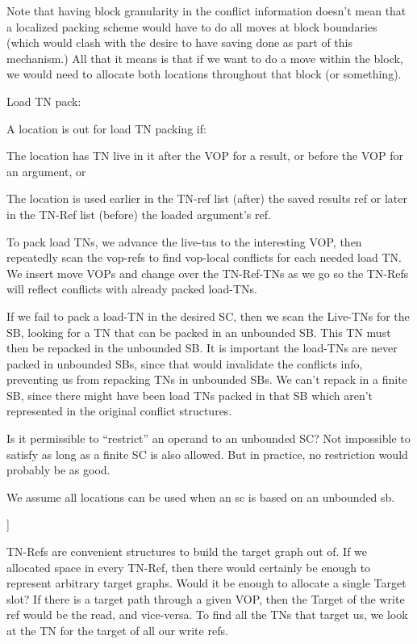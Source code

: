 Note that having block granularity in the conflict information doesn't mean
that a localized packing scheme would have to do all moves at block boundaries
(which would clash with the desire to have saving done as part of this
mechanism.)  All that it means is that if we want to do a move within the
block, we would need to allocate both locations throughout that block (or
something).





Load TN pack:

A location is out for load TN packing if: 

The location has TN live in it after the VOP for a result, or before the VOP
for an argument, or

The location is used earlier in the TN-ref list (after) the saved results ref
or later in the TN-Ref list (before) the loaded argument's ref.

To pack load TNs, we advance the live-tns to the interesting VOP, then
repeatedly scan the vop-refs to find vop-local conflicts for each needed load
TN.  We insert move VOPs and change over the TN-Ref-TNs as we go so the TN-Refs
will reflect conflicts with already packed load-TNs.

If we fail to pack a load-TN in the desired SC, then we scan the Live-TNs for
the SB, looking for a TN that can be packed in an unbounded SB.  This TN must
then be repacked in the unbounded SB.  It is important the load-TNs are never
packed in unbounded SBs, since that would invalidate the conflicts info,
preventing us from repacking TNs in unbounded SBs.  We can't repack in a finite
SB, since there might have been load TNs packed in that SB which aren't
represented in the original conflict structures.

Is it permissible to ``restrict'' an operand to an unbounded SC?  Not impossible
to satisfy as long as a finite SC is also allowed.  But in practice, no
restriction would probably be as good.

We assume all locations can be used when an sc is based on an unbounded sb.

]


TN-Refs are convenient structures to build the target graph out of.  If we
allocated space in every TN-Ref, then there would certainly be enough to
represent arbitrary target graphs.  Would it be enough to allocate a single
Target slot?  If there is a target path through a given VOP, then the Target of
the write ref would be the read, and vice-versa.  To find all the TNs that
target us, we look at the TN for the target of all our write refs.

